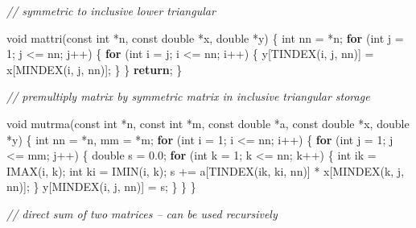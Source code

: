 \documentclass[12pt,]{article}
\newenvironment{Shaded}{\begin{snugshade}}{\end{snugshade}}
\newcommand{\DataTypeTok}[1]{\textcolor[rgb]{0.13,0.29,0.53}{#1}}
\newcommand{\DecValTok}[1]{\textcolor[rgb]{0.00,0.00,0.81}{#1}}
\newcommand{\FloatTok}[1]{\textcolor[rgb]{0.00,0.00,0.81}{#1}}
\newcommand{\CommentTok}[1]{\textcolor[rgb]{0.56,0.35,0.01}{\textit{#1}}}
\newcommand{\ControlFlowTok}[1]{\textcolor[rgb]{0.13,0.29,0.53}{\textbf{#1}}}
\newcommand{\NormalTok}[1]{#1}
\begin{document}
\begin{Shaded}
\begin{Highlighting}[]
{{{{{\CommentTok{// symmetric to inclusive lower triangular}

\DataTypeTok{void}\NormalTok{ mattri(}\DataTypeTok{const} \DataTypeTok{int}\NormalTok{ *n, }\DataTypeTok{const} \DataTypeTok{double}\NormalTok{ *x, }\DataTypeTok{double}\NormalTok{ *y) \{}
    \DataTypeTok{int}\NormalTok{ nn = *n;}
    \ControlFlowTok{for}\NormalTok{ (}\DataTypeTok{int}\NormalTok{ j = }\DecValTok{1}\NormalTok{; j <= nn; j++) \{}
        \ControlFlowTok{for}\NormalTok{ (}\DataTypeTok{int}\NormalTok{ i = j; i <= nn; i++) \{}
\NormalTok{            y[TINDEX(i, j, nn)] = x[MINDEX(i, j, nn)];}
\NormalTok{        \}}
\NormalTok{    \}}
    \ControlFlowTok{return}\NormalTok{;}
\NormalTok{\}}

\CommentTok{// premultiply matrix by symmetric matrix in inclusive triangular storage}

\DataTypeTok{void}\NormalTok{ mutrma(}\DataTypeTok{const} \DataTypeTok{int}\NormalTok{ *n, }\DataTypeTok{const} \DataTypeTok{int}\NormalTok{ *m, }\DataTypeTok{const} \DataTypeTok{double}\NormalTok{ *a, }\DataTypeTok{const} \DataTypeTok{double}\NormalTok{ *x,}
            \DataTypeTok{double}\NormalTok{ *y) \{}
    \DataTypeTok{int}\NormalTok{ nn = *n, mm = *m;}
    \ControlFlowTok{for}\NormalTok{ (}\DataTypeTok{int}\NormalTok{ i = }\DecValTok{1}\NormalTok{; i <= nn; i++) \{}
        \ControlFlowTok{for}\NormalTok{ (}\DataTypeTok{int}\NormalTok{ j = }\DecValTok{1}\NormalTok{; j <= mm; j++) \{}
            \DataTypeTok{double}\NormalTok{ s = }\FloatTok{0.0}\NormalTok{;}
            \ControlFlowTok{for}\NormalTok{ (}\DataTypeTok{int}\NormalTok{ k = }\DecValTok{1}\NormalTok{; k <= nn; k++) \{}
                \DataTypeTok{int}\NormalTok{ ik = IMAX(i, k);}
                \DataTypeTok{int}\NormalTok{ ki = IMIN(i, k);}
\NormalTok{                s += a[TINDEX(ik, ki, nn)] * x[MINDEX(k, j, nn)];}
\NormalTok{            \}}
\NormalTok{            y[MINDEX(i, j, nn)] = s;}
\NormalTok{        \}}
\NormalTok{    \}}
\NormalTok{\}}

\CommentTok{// direct sum of two matrices -- can be used recursively}

}}}}}
\end{Highlighting}
\end{Shaded}
\end{document}
